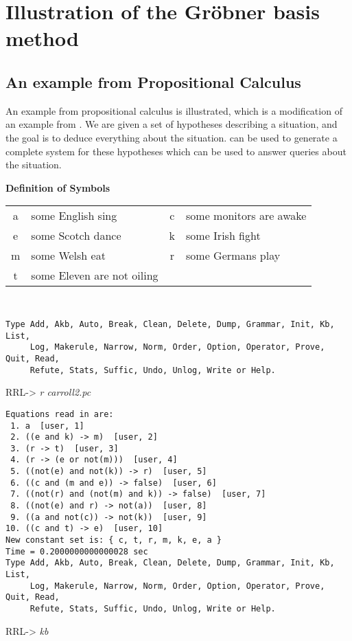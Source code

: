 \chapter {Illustration of the Gr\"{o}bner basis method} 
\section{An example from Propositional Calculus}
\normalsize 
\rm 
An example from propositional calculus is illustrated, which
is a modification of an
example from \cite{Carroll}. We are given a set of hypotheses
describing a situation, and the goal is to deduce everything about the
situation.  \RRL can be used to generate a complete system for these
hypotheses which can be used to answer queries about the situation.
\begin{center}
\bf Definition of Symbols
\end{center}
\begin{tabular}{clcl}
a & some English sing & c & some monitors are awake \\
e & some Scotch dance & k & some Irish fight \\
m & some Welsh eat & r & some Germans play \\
t & some Eleven are not oiling & &
\end{tabular}
\small
\tt
\begin{verbatim}
Type Add, Akb, Auto, Break, Clean, Delete, Dump, Grammar, Init, Kb, List,
     Log, Makerule, Narrow, Norm, Order, Option, Operator, Prove, Quit, Read,
     Refute, Stats, Suffic, Undo, Unlog, Write or Help.
\end{verbatim}
RRL-> {\em r carroll2.pc}
\begin{verbatim}
Equations read in are:
 1. a  [user, 1]
 2. ((e and k) -> m)  [user, 2]
 3. (r -> t)  [user, 3]
 4. (r -> (e or not(m)))  [user, 4]
 5. ((not(e) and not(k)) -> r)  [user, 5]
 6. ((c and (m and e)) -> false)  [user, 6]
 7. ((not(r) and (not(m) and k)) -> false)  [user, 7]
 8. ((not(e) and r) -> not(a))  [user, 8]
 9. ((a and not(c)) -> not(k))  [user, 9]
10. ((c and t) -> e)  [user, 10]
New constant set is: { c, t, r, m, k, e, a }
Time = 0.2000000000000028 sec
Type Add, Akb, Auto, Break, Clean, Delete, Dump, Grammar, Init, Kb, List,
     Log, Makerule, Narrow, Norm, Order, Option, Operator, Prove, Quit, Read,
     Refute, Stats, Suffic, Undo, Unlog, Write or Help.
\end{verbatim}
RRL-> {\em kb}
